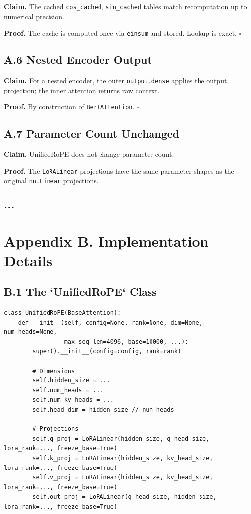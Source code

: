 {\textbf{Claim.} The cached \texttt{cos\_cached}, \texttt{sin\_cached} tables match recomputation 
up to numerical precision.

\textbf{Proof.} The cache is computed once via \texttt{einsum} and stored. Lookup is 
exact. $\square$

\subsection{A.6 Nested Encoder Output}

\textbf{Claim.} For a nested encoder, the outer \texttt{output.dense} applies the 
output projection; the inner attention returns raw context.

\textbf{Proof.} By construction of \texttt{BertAttention}. $\square$

\subsection{A.7 Parameter Count Unchanged}

\textbf{Claim.} UnifiedRoPE does not change parameter count.

\textbf{Proof.} The \texttt{LoRALinear} projections have the same parameter shapes as 
the original \texttt{nn.Linear} projections. $\square$
\begin{lstlisting}

---
\end{lstlisting}


\section{Appendix B. Implementation Details}

\subsection{B.1 The `UnifiedRoPE` Class}

\begin{lstlisting}
class UnifiedRoPE(BaseAttention):
    def __init__(self, config=None, rank=None, dim=None, num_heads=None,
                 max_seq_len=4096, base=10000, ...):
        super().__init__(config=config, rank=rank)
        
        # Dimensions
        self.hidden_size = ...
        self.num_heads = ...
        self.num_kv_heads = ...
        self.head_dim = hidden_size // num_heads
        
        # Projections
        self.q_proj = LoRALinear(hidden_size, q_head_size, lora_rank=..., freeze_base=True)
        self.k_proj = LoRALinear(hidden_size, kv_head_size, lora_rank=..., freeze_base=True)
        self.v_proj = LoRALinear(hidden_size, kv_head_size, lora_rank=..., freeze_base=True)
        self.out_proj = LoRALinear(q_head_size, hidden_size, lora_rank=..., freeze_base=True)
        

\end{lstlisting}}
